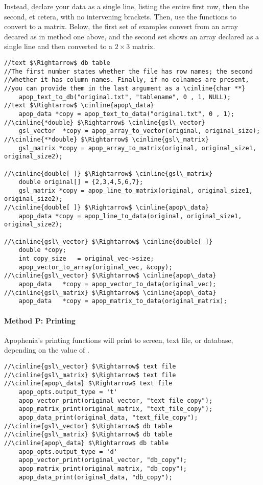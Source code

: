Instead, declare your data as a single line, listing the entire first
row, then the second, et cetera, with no intervening brackets. Then, use
the  functions to convert to a matrix. Below, the
first set of examples convert from an array decared as in method one
above, and the second set shows an array declared as a single line and
then converted to a $2 \times 3$ matrix.
\begin{lstlisting}
//text $\Rightarrow$ db table
//The first number states whether the file has row names; the second
//whether it has column names. Finally, if no colnames are present,
//you can provide them in the last argument as a \cinline{char **}
    apop_text_to_db("original.txt", "tablename", 0 , 1, NULL);
//text $\Rightarrow$ \cinline{apop\_data}
    apop_data *copy = apop_text_to_data("original.txt", 0 , 1);
//\cinline{*double} $\Rightarrow$ \cinline{gsl\_vector}
    gsl_vector  *copy = apop_array_to_vector(original, original_size);
//\cinline{**double} $\Rightarrow$ \cinline{gsl\_matrix}
    gsl_matrix *copy = apop_array_to_matrix(original, original_size1, original_size2);

//\cinline{double[ ]} $\Rightarrow$ \cinline{gsl\_matrix}
    double original[] = {2,3,4,5,6,7};
    gsl_matrix *copy = apop_line_to_matrix(original, original_size1, original_size2);
//\cinline{double[ ]} $\Rightarrow$ \cinline{apop\_data}
    apop_data *copy = apop_line_to_data(original, original_size1, original_size2);

//\cinline{gsl\_vector} $\Rightarrow$ \cinline{double[ ]}
    double *copy;
    int copy_size   = original_vec->size;
    apop_vector_to_array(original_vec, &copy);
//\cinline{gsl\_vector} $\Rightarrow$ \cinline{apop\_data}
    apop_data   *copy = apop_vector_to_data(original_vec);
//\cinline{gsl\_matrix} $\Rightarrow$ \cinline{apop\_data}
    apop_data   *copy = apop_matrix_to_data(original_matrix);
\end{lstlisting}

\paragraph{Method P: Printing}
  
Apophenia's printing functions will print to screen, text file, or
database, depending on the value of .
\begin{lstlisting}
//\cinline{gsl\_vector} $\Rightarrow$ text file
//\cinline{gsl\_matrix} $\Rightarrow$ text file
//\cinline{apop\_data} $\Rightarrow$ text file
    apop_opts.output_type = 't'
    apop_vector_print(original_vector, "text_file_copy");
    apop_matrix_print(original_matrix, "text_file_copy");
    apop_data_print(original_data, "text_file_copy");
//\cinline{gsl\_vector} $\Rightarrow$ db table
//\cinline{gsl\_matrix} $\Rightarrow$ db table
//\cinline{apop\_data} $\Rightarrow$ db table
    apop_opts.output_type = 'd'
    apop_vector_print(original_vector, "db_copy");
    apop_matrix_print(original_matrix, "db_copy");
    apop_data_print(original_data, "db_copy");
\end{lstlisting}


